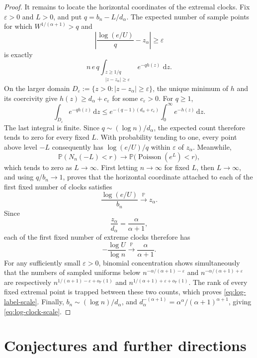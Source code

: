 \documentclass[11pt]{article}
\numberwithin{equation}{section}
\theoremstyle{definition}
\theoremstyle{remark}
\newcommand{\Pp}{\mathbb P}
\newcommand{\dd}{\,\mathrm d}
\begin{document}
\begin{proof}
It remains to locate the horizontal coordinates of the extremal clocks.
Fix $\varepsilon>0$ and $L>0$, and put $q=b_n-L/d_\alpha$.
The expected number of sample points for which
$W^{1/(\alpha+1)}>q$ and
\[
  \left|\frac{\log(e/U)}{q}-z_\alpha\right|\geq\varepsilon
\]
is exactly
\[
  n\,e\,q\!\!\int_{\substack{z\geq1/q\\|z-z_\alpha|\geq\varepsilon}}
  e^{-q h(z)}\,\dd z.
\]
On the larger domain $D_\varepsilon:=
\{z>0:|z-z_\alpha|\geq\varepsilon\}$, the unique minimum of $h$ and its
coercivity give $h(z)\geq d_\alpha+c_\varepsilon$ for some
$c_\varepsilon>0$.  For $q\geq1$,
\[
 \int_{D_\varepsilon}e^{-q h(z)}\dd z
 \leq e^{-(q-1)(d_\alpha+c_\varepsilon)}
       \int_0^\infty e^{-h(z)}\dd z.
\]
The last integral is finite.  Since $q\sim(\log n)/d_\alpha$, the
expected count therefore tends to zero for every fixed $L$.
With probability tending to one, every point above level $-L$ consequently
has $\log(e/U)/q$ within $\varepsilon$ of $z_\alpha$.
Meanwhile,
\[
 \Pp(N_n(-L)<r)
 \longrightarrow\Pp\bigl(\operatorname{Poisson}(e^L)<r\bigr),
\]
which tends to zero as $L\to\infty$.  First letting $n\to\infty$ for
fixed $L$, then $L\to\infty$, and using $q/b_n\to1$, proves that the
horizontal coordinate attached to each of the first fixed number of
clocks satisfies
\begin{equation}
  \frac{\log(e/U)}{b_n}\xrightarrow{\Pp}z_\alpha.
  \label{eq:log-saddle-location}
\end{equation}
Since
\[
  \frac{z_\alpha}{d_\alpha}=\frac{\alpha}{\alpha+1},
\]
each of the first fixed number of extreme clocks therefore has
\[
  -\frac{\log U}{\log n}\xrightarrow{\Pp}
  \frac{\alpha}{\alpha+1}.
\]
For any sufficiently small $\varepsilon>0$, binomial concentration shows simultaneously
that the numbers of sampled uniforms below
$n^{-\alpha/(\alpha+1)-\varepsilon}$ and
$n^{-\alpha/(\alpha+1)+\varepsilon}$ are respectively
$n^{1/(\alpha+1)-\varepsilon+o_{\Pp}(1)}$ and
$n^{1/(\alpha+1)+\varepsilon+o_{\Pp}(1)}$.
The rank of every fixed extremal point is trapped between these two
counts, which proves \eqref{eq:log-label-scale}.  Finally,
$b_n\sim(\log n)/d_\alpha$, and
$d_\alpha^{-(\alpha+1)}
=\alpha^\alpha/(\alpha+1)^{\alpha+1}$, giving
\eqref{eq:log-clock-scale}.
\end{proof}

\section{Conjectures and further directions}
\label{sec:conjectures}
\end{document}
